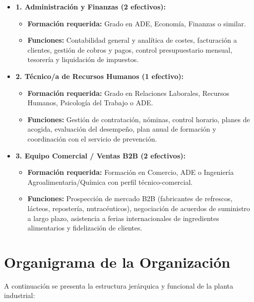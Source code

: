 \begin{itemize}[leftmargin=*]
    \item \textbf{1. Administración y Finanzas (2 efectivos):}
          \begin{itemize}
              \item \textbf{Formación requerida:} Grado en ADE, Economía, Finanzas o similar.
              \item \textbf{Funciones:} Contabilidad general y analítica de costes, facturación a clientes, gestión de cobros y pagos, control presupuestario mensual, tesorería y liquidación de impuestos.
          \end{itemize}

    \item \textbf{2. Técnico/a de Recursos Humanos (1 efectivo):}
          \begin{itemize}
              \item \textbf{Formación requerida:} Grado en Relaciones Laborales, Recursos Humanos, Psicología del Trabajo o ADE.
              \item \textbf{Funciones:} Gestión de contratación, nóminas, control horario, planes de acogida, evaluación del desempeño, plan anual de formación y coordinación con el servicio de prevención.
          \end{itemize}

    \item \textbf{3. Equipo Comercial / Ventas B2B (2 efectivos):}
          \begin{itemize}
              \item \textbf{Formación requerida:} Formación en Comercio, ADE o Ingeniería Agroalimentaria/Química con perfil técnico-comercial.
              \item \textbf{Funciones:} Prospección de mercado B2B (fabricantes de refrescos, lácteos, repostería, nutracéuticos), negociación de acuerdos de suministro a largo plazo, asistencia a ferias internacionales de ingredientes alimentarios y fidelización de clientes.
          \end{itemize}
\end{itemize}

\section{Organigrama de la Organización}

A continuación se presenta la estructura jerárquica y funcional de la planta industrial:

